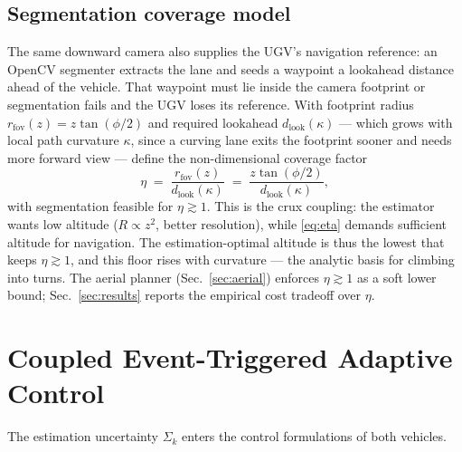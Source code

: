 \documentclass[letterpaper, 10 pt, conference]{ieeeconf}  %
\begin{document}
\subsection{Segmentation coverage model}
\label{sec:coverage}
The same downward camera also supplies the UGV's {navigation} reference: an OpenCV
segmenter extracts the lane and seeds a waypoint a lookahead distance ahead of the vehicle.
That waypoint must lie inside the camera footprint or segmentation fails and the UGV loses its
reference. With footprint radius $r_{\mathrm{fov}}(z)=z\tan(\phi/2)$ and required lookahead
$d_{\mathrm{look}}(\kappa)$ --- which grows with local path curvature $\kappa$, since a curving
lane exits the footprint sooner and needs more forward view --- define the non-dimensional
{coverage factor}
\begin{equation}
\eta \;=\; \frac{r_{\mathrm{fov}}(z)}{d_{\mathrm{look}}(\kappa)}
      \;=\; \frac{z\tan(\phi/2)}{d_{\mathrm{look}}(\kappa)} ,
\label{eq:eta}
\end{equation}
with segmentation feasible for $\eta\gtrsim1$. This is the crux coupling: the estimator wants {low} altitude ($R\propto z^2$, better
resolution), while \eqref{eq:eta} demands {sufficient} altitude for navigation. The
estimation-optimal altitude is thus the lowest that keeps $\eta\gtrsim1$, and this floor rises
with curvature --- the analytic basis for climbing into turns. The aerial planner
(Sec.~\ref{sec:aerial}) enforces $\eta\gtrsim1$ as a soft lower bound; Sec.~\ref{sec:results}
reports the empirical cost tradeoff over $\eta$.

\section{Coupled Event-Triggered Adaptive Control}
\label{sec:method}

The estimation uncertainty $\Sigma_k$ enters the control formulations of both
vehicles.
\end{document}

